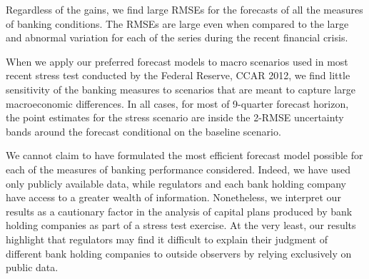 \documentclass[12pt]{article}
\begin{document}
Regardless of the gains, we find large RMSEs for the forecasts of
all the measures of banking conditions. The RMSEs are large even
when compared to the large and abnormal variation for each of the
series during the recent financial crisis.

When we apply our preferred forecast models to macro scenarios
used in most recent stress test conducted by the Federal Reserve,
CCAR 2012, we find little sensitivity of the banking measures to
scenarios that are meant to capture large macroeconomic
differences. In all cases, for most of 9-quarter forecast horizon,
the point estimates for the stress scenario are inside the 2-RMSE
uncertainty bands around the forecast conditional on the baseline
scenario.

We cannot claim to have formulated the most efficient forecast
model possible for each of the measures of banking performance
considered. Indeed, we have used only publicly available data,
while regulators and each bank holding company have access to a
greater wealth of information. Nonetheless, we interpret our
results as a cautionary factor in the analysis of capital plans
produced by bank holding companies as part of a stress test
exercise. At the very least, our results highlight that regulators
may find it difficult to explain their judgment of different bank
holding companies to outside observers by relying exclusively on
public data.

\clearpage




\clearpage
\end{document}
